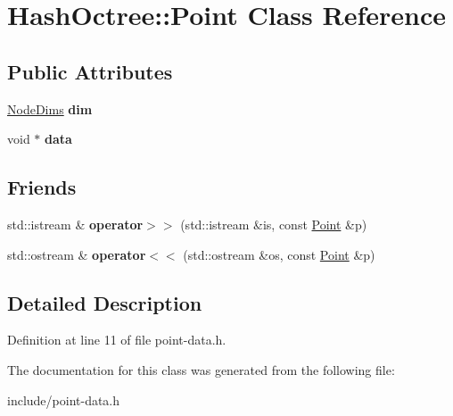 \hypertarget{class_hash_octree_1_1_point}{}\section{Hash\+Octree\+::Point Class Reference}
\label{class_hash_octree_1_1_point}
\subsection*{Public Attributes}
\begin{DoxyCompactItemize}
\item 
\mbox{\label{class_hash_octree_1_1_point_a25bf5dc109d97354ba1f11c3e3931086}} 
\mbox{\hyperlink{class_hash_octree_1_1_node_dims}{Node\+Dims}} {\bfseries dim}
\item 
\mbox{\label{class_hash_octree_1_1_point_a8151be35caed953482bd7f4b49e226af}} 
void $\ast$ {\bfseries data}
\end{DoxyCompactItemize}
\subsection*{Friends}
\begin{DoxyCompactItemize}
\item 
\mbox{\label{class_hash_octree_1_1_point_ac7c7e29a9e81197fa739bbf8fbfaacec}} 
std\+::istream \& {\bfseries operator$>$$>$} (std\+::istream \&is, const \mbox{\hyperlink{class_hash_octree_1_1_point}{Point}} \&p)
\item 
\mbox{\label{class_hash_octree_1_1_point_aab55cf13db83c55c46a961b2b2441960}} 
std\+::ostream \& {\bfseries operator$<$$<$} (std\+::ostream \&os, const \mbox{\hyperlink{class_hash_octree_1_1_point}{Point}} \&p)
\end{DoxyCompactItemize}


\subsection{Detailed Description}


Definition at line 11 of file point-\/data.\+h.



The documentation for this class was generated from the following file\+:\begin{DoxyCompactItemize}
\item 
include/point-\/data.\+h\end{DoxyCompactItemize}
